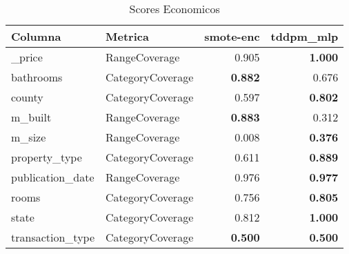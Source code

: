 \begin{table}[H]
\centering
\caption{Scores Economicos}
\label{table-coverage-economicos-a-2}
\begin{tabular}{|l|l|r|r|}
\hline
\rowcolor[gray]{0.8}
Columna & Metrica & smote-enc & tddpm\_mlp \\
\hline \_price & RangeCoverage & 0.905 & \bfseries 1.000 \\
\hline bathrooms & CategoryCoverage & \bfseries 0.882 & 0.676 \\
\hline county & CategoryCoverage & 0.597 & \bfseries 0.802 \\
\hline m\_built & RangeCoverage & \bfseries 0.883 & 0.312 \\
\hline m\_size & RangeCoverage & 0.008 & \bfseries 0.376 \\
\hline property\_type & CategoryCoverage & 0.611 & \bfseries 0.889 \\
\hline publication\_date & RangeCoverage & 0.976 & \bfseries 0.977 \\
\hline rooms & CategoryCoverage & 0.756 & \bfseries 0.805 \\
\hline state & CategoryCoverage & 0.812 & \bfseries 1.000 \\
\hline transaction\_type & CategoryCoverage & \bfseries 0.500 & \bfseries 0.500 \\
\hline
\end{tabular}
\end{table}
